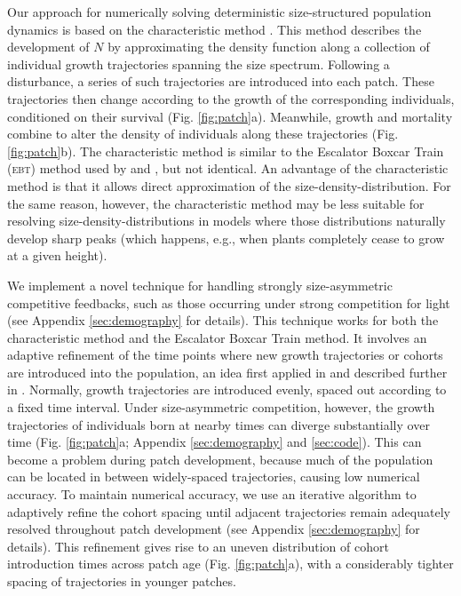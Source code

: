 \documentclass[a4paper,11pt]{article}
\begin{document}
Our approach for numerically solving deterministic size-structured population dynamics is
based on the characteristic method \citep{Angulo-2004}. This method describes the development of \(N\) by approximating the
density function along a collection of individual growth trajectories spanning the size
spectrum. Following a disturbance, a series of such trajectories are introduced
into each patch. These trajectories then change according to the growth
of the corresponding individuals, conditioned on their survival
(Fig. \ref{fig:patch}a). Meanwhile, growth and mortality combine
to alter the density of individuals along these trajectories
(Fig. \ref{fig:patch}b). The characteristic method is similar to the Escalator Boxcar Train (\textsc{ebt}) method
\citep{Deroos-1988, Deroos-1997} used by \citet{Falster-2011} and
\citet{Falster-2015}, but not identical. An advantage of the characteristic method is that it allows direct approximation of the size-density-distribution. For the same reason, however, the characteristic method may be less suitable for resolving size-density-distributions in models where those distributions naturally develop sharp peaks (which happens, e.g., when plants completely cease to grow at a given height).

We implement a novel technique for
handling strongly size-asymmetric competitive feedbacks, such as those occurring
under strong competition for light (see Appendix \ref{sec:demography}
for details). This technique works for both the characteristic method and the Escalator Boxcar Train method. It involves an
adaptive refinement of the time points where new growth trajectories or cohorts are introduced
into the population, an idea first applied in \citet{Falster-2011} and
described further in \citet{Falster-2015}.
Normally, growth trajectories are introduced evenly, spaced out according to a fixed time
interval. Under size-asymmetric competition, however, the growth
trajectories of individuals born at nearby times can diverge
substantially over time (Fig. \ref{fig:patch}a; Appendix
\ref{sec:demography} and \ref{sec:code}). This can become a problem during patch
development, because much of the population can be located in between
widely-spaced trajectories, causing low numerical accuracy. To maintain
numerical accuracy, we use an iterative algorithm to adaptively refine
the cohort spacing until adjacent trajectories remain
adequately resolved throughout patch development (see Appendix
\ref{sec:demography} for details). This refinement gives rise to an uneven
distribution of cohort introduction times across patch age (Fig.
\ref{fig:patch}a), with a considerably tighter spacing of trajectories in
younger patches.
\end{document}
